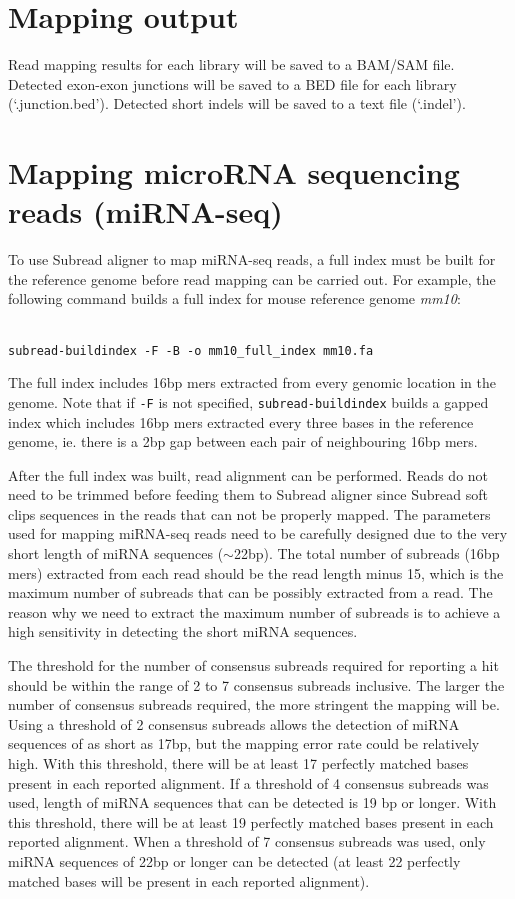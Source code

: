\documentclass[12pt]{report}
\newcommand{\code}[1]{{\small\texttt{#1}}}
\newcommand{\Subread}{\textsf{Subread}}
\begin{document}
\section{Mapping output}

Read mapping results for each library will be saved to a BAM/SAM file.
Detected exon-exon junctions will be saved to a BED file for each library (`.junction.bed').
Detected short indels will be saved to a text file (`.indel').\\



\section{Mapping microRNA sequencing reads (miRNA-seq)}

To use {\Subread} aligner to map miRNA-seq reads, a full index must be built for the reference genome before read mapping can be carried out.
For example, the following command builds a full index for mouse reference genome \emph{mm10}:

\code{\\
subread-buildindex -F -B -o mm10\_full\_index mm10.fa \\
}

The full index includes 16bp mers extracted from every genomic location in the genome.
Note that if \code{-F} is not specified, \code{subread-buildindex} builds a gapped index which includes 16bp mers extracted every three bases in the reference genome, ie. there is a 2bp gap between each pair of neighbouring 16bp mers.

After the full index was built, read alignment can be performed.
Reads do not need to be trimmed before feeding them to {\Subread} aligner since {\Subread} soft clips sequences in the reads that can not be properly mapped.
The parameters used for mapping miRNA-seq reads need to be carefully designed due to the very short length of miRNA sequences ($\sim$22bp).
The total number of subreads (16bp mers) extracted from each read should be the read length minus 15, which
is the maximum number of subreads that can be possibly extracted from a read.
The reason why we need to extract the maximum number of subreads is to achieve a high sensitivity in detecting the short miRNA sequences.

The threshold for the number of consensus subreads required for reporting a hit should be within the range of 2 to 7 consensus subreads inclusive.
The larger the number of consensus subreads required, the more stringent the mapping will be.
Using a threshold of 2 consensus subreads allows the detection of miRNA sequences of as short as 17bp, but the mapping error rate could be relatively high.
With this threshold, there will be at least 17 perfectly matched bases present in each reported alignment.
If a threshold of 4 consensus subreads was used, length of miRNA sequences that can be detected is 19 bp or longer.
With this threshold, there will be at least 19 perfectly matched bases present in each reported alignment.
When a threshold of 7 consensus subreads was used, only miRNA sequences of 22bp or longer can be detected (at least 22 perfectly matched bases will be present in each reported alignment).
\end{document}
